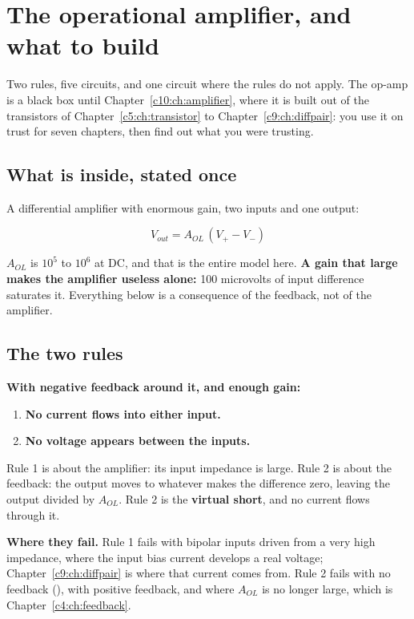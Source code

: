 
\section{The operational amplifier, and what to build}
\label{c3:app:b}

Two rules, five circuits, and one circuit where the rules do not apply. The op-amp is a black box until Chapter~\ref{c10:ch:amplifier}, where it is built out of the transistors of Chapter~\ref{c5:ch:transistor} to Chapter~\ref{c9:ch:diffpair}: you use it on trust for seven chapters, then find out what you were trusting.

\subsection{What is inside, stated once}
\label{c3:sec:b1}
A differential amplifier with enormous gain, two inputs and one output:

\[
  V_{out} = A_{OL}\,(V_+ - V_-)
\]

$A_{OL}$ is $10^5$ to $10^6$ at DC, and that is the entire model here. \textbf{A gain that large makes the amplifier useless alone:} 100 microvolts of input difference saturates it. Everything below is a consequence of the feedback, not of the amplifier.

\subsection{The two rules}
\label{c3:sec:b2}
\textbf{With negative feedback around it, and enough gain:}

\begin{enumerate}
  \item \textbf{No current flows into either input.}
  \item \textbf{No voltage appears between the inputs.}
\end{enumerate}
Rule 1 is about the amplifier: its input impedance is large. Rule 2 is about the feedback: the output moves to whatever makes the difference zero, leaving the output divided by $A_{OL}$. Rule 2 is the \textbf{virtual short}, and no current flows through it.

\textbf{Where they fail.} Rule 1 fails with bipolar inputs driven from a very high impedance, where the input bias current develops a real voltage; Chapter~\ref{c9:ch:diffpair} is where that current comes from. Rule 2 fails with no feedback (), with positive feedback, and where $A_{OL}$ is no longer large, which is Chapter~\ref{c4:ch:feedback}.

